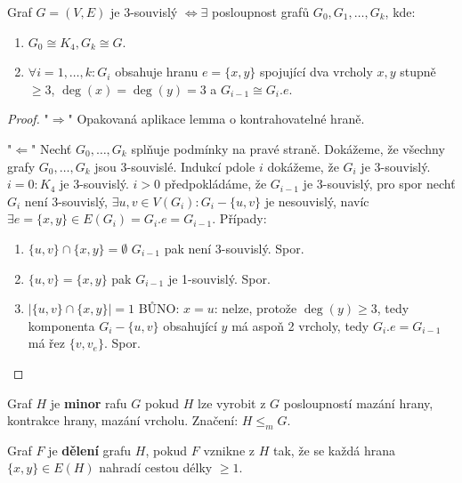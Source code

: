 \begin{veta}
	Graf $G = (V,E)$ je 3-souvislý $\Leftrightarrow \exists$ posloupnost grafů $G_{0},G_{1},\dots ,G_{k}$, kde:
	
	\begin{enumerate}
		\item $G_{0} \cong K_{4}, G_{k} \cong G$.
		\item $\forall i = 1, \dots , k: G_{i}$ obsahuje hranu $e = \{x,y\}$ spojující dva vrcholy $x,y$ stupně $\geq 3$, $\deg(x) = \deg(y) = 3$ a $G_{i-1} \cong G_{i}.e$.
	\end{enumerate}
\end{veta}

\begin{proof}
	"$\Rightarrow$" Opakovaná aplikace lemma o kontrahovatelné hraně.
	
	"$\Leftarrow$" Nechť $G_{0}, \dots ,G_{k}$ splňuje podmínky na pravé straně. Dokážeme, že všechny grafy $G_{0}, \dots ,G_{k}$ jsou 3-souvislé. Indukcí pdole $i$ dokážeme, že $G_{i}$ je 3-souvislý. $i = 0 : K_{4}$ je 3-souvislý. $i > 0$ předpokládáme, že $G_{i-1}$ je 3-souvislý, pro spor nechť $G_{i}$ není 3-souvislý, $\exists u,v \in V(G_{i}): G_{i} - \{u,v\}$ je nesouvislý, navíc $\exists e = \{x,y\} \in E(G_{i}) = G_{i}.e = G_{i-1}$. Případy:
	
	\begin{enumerate}
		\item $\{u,v\} \cap \{x,y\} = \emptyset$ $G_{i-1}$ pak není 3-souvislý. Spor.
		\item $\{u,v\} = \{x,y\}$ pak $G_{i-1}$ je 1-souvislý. Spor.
		\item $|\{u,v\} \cap \{x,y\}| = 1$ BŮNO: $x = u$: nelze, protože $\deg (y) \geq 3$, tedy komponenta $G_{i} - \{u,v\}$ obsahující $y$ má aspoň 2 vrcholy, tedy $G_{i}.e = G_{i-1}$ má řez $\{v, v_{e}\}$. Spor.
	\end{enumerate}
\end{proof}

\begin{definice}
	Graf $H$ je \textbf{minor} rafu $G$ pokud $H$ lze vyrobit z $G$ posloupností mazání hrany, kontrakce hrany, mazání vrcholu. Značení: $H \leq_{m} G$.
\end{definice}

\begin{definice}
	Graf $F$ je \textbf{dělení} grafu $H$, pokud $F$ vznikne z $H$ tak, že se každá hrana $\{x,y\} \in E(H)$ nahradí cestou délky $\geq 1$.
\end{definice}

